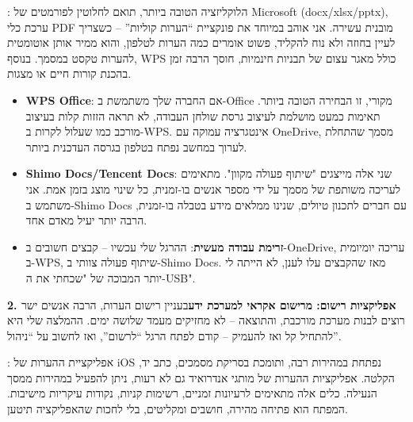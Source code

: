 


: הלוקליזציה הטובה ביותר, תואם לחלוטין לפורמטים של Microsoft (docx/xlsx/pptx), ערכת כלי PDF מובנית עשירה. אני אוהב במיוחד את פונקציית “הערות קוליות” – כשצריך לעיין בחוזה ולא נוח להקליד, פשוט אומרים כמה הערות לטלפון, והוא ממיר אותן אוטומטית להערות טקסט במסמך. בנוסף, WPS כולל מאגר עצום של תבניות חינמיות, חוסך הרבה זמן בהכנת קורות חיים או מצגות.

\begin{itemize}
  \item \textbf{WPS Office}: אם החברה שלך משתמשת ב-Office מקורי, זו הבחירה הטובה ביותר. תאימות כמעט מושלמת לעיצוב גרסת שולחן העבודה, לא תראה הזזות קלות בעיצוב מורכב כמו שעלול לקרות ב-WPS. אינטגרציה עמוקה עם OneDrive, מסמך שהתחלת לערוך במחשב נפתח בטלפון בגרסה העדכנית ביותר.
  \item \textbf{Shimo Docs/Tencent Docs}: שני אלה מייצגים "שיתוף פעולה מקוון". מתאימים לעריכה משותפת של מסמך על ידי מספר אנשים בו-זמנית, כל שינוי מוצג בזמן אמת. אני משתמש ב-Shimo Docs עם חברים לתכנון טיולים, שנינו ממלאים מידע בטבלה בו-זמנית, הרבה יותר יעיל מאדם אחד.
  \item \textbf{זרימת עבודה מעשית}: ההרגל שלי עכשיו – קבצים חשובים ב-OneDrive, עריכה יומיומית ב-WPS, שיתוף פעולה צוותי ב-Shimo Docs. מאז שהקבצים עלו לענן, לא הייתה לי יותר המבוכה של "שכחתי את ה-USB".
\end{itemize}

\textbf{2. אפליקציות רישום: מרישום אקראי למערכת ידע}בעניין רישום הערות, הרבה אנשים ישר רוצים לבנות מערכת מורכבת, והתוצאה – לא מחזיקים מעמד שלושה ימים. ההמלצה שלי היא להתחיל קל ואז להעמיק – קודם לפתח הרגל “לרשום”, ואז לחשוב על “ניהול”.


: אפליקציית ההערות של iOS נפתחת במהירות רבה, ותומכת בסריקת מסמכים, כתב יד, הקלטה. אפליקציות ההערות של מותגי אנדרואיד גם לא רעות, ניתן להפעיל במהירות ממסך הנעילה. כלים אלה מתאימים לרעיונות זמניים, רשימות קניות, נקודות עיקריות מישיבות. המפתח הוא פתיחה מהירה, חושבים ומקליטים, בלי לחכות שהאפליקציה תיטען.

